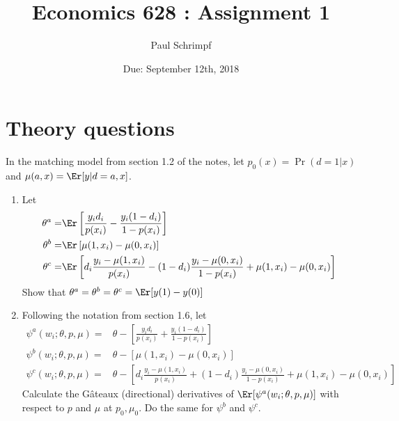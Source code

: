 

\title{Economics 628 : Assignment 1}
\author{Paul Schrimpf}
\date{Due: September 12th, 2018}


\maketitle

\section{Theory questions}

\begin{problem}
  In the matching model from section 1.2 of the notes, let $p_0(x) =
  \Pr(d=1|x)$ and $\mu(a,x) = \Er[y|d=a,x]$. 
  \begin{enumerate}
  \item Let
    \begin{align*}
      \theta^a = & \Er\left[\frac{y_i d_i}{p(x_i)} - \frac{y_i
               (1-d_i)}{1-p(x_i)} \right] \\
      \theta^b = & \Er\left[\mu(1,x_i) - \mu(0,x_i)\right] \\
      \theta^c = & \Er\left[d_i \frac{y_i -\mu(1,x_i)}{p(x_i)} -
                   (1-d_i)\frac{y_i - \mu(0,x_i)}{1-p(x_i)} +
                   \mu(1,x_i) - \mu(0,x_i)\right]
    \end{align*}
    Show that $\theta^a = \theta^b = \theta^c = \Er[y(1) - y(0)]$
  \item Following the notation from section 1.6, let
    \begin{align*}
      \psi^a(w_i;\theta,p,\mu) = & \theta - \left[\frac{y_i d_i}{p(x_i)} + \frac{y_i
                                   (1-d_i)}{1-p(x_i)} \right] \\
      \psi^b(w_i;\theta,p,\mu) = & \theta - \left[\mu(1,x_i) - \mu(0,x_i)\right] \\
      \psi^c(w_i;\theta,p,\mu) = & \theta - \left[d_i \frac{y_i -\mu(1,x_i)}{p(x_i)} +
                                   (1-d_i)\frac{y_i - \mu(0,x_i)}{1-p(x_i)} +
                                   \mu(1,x_i) - \mu(0,x_i)\right]
    \end{align*}                                   
    Calculate the G\^{a}teaux (directional) derivatives of
    $\Er[\psi^a(w_i;\theta,p,\mu)]$ with respect to $p$ and $\mu$ at
    $p_0, \mu_0$. Do the same for $\psi^b$ and $\psi^c$.    
  \end{enumerate}
\end{problem}



